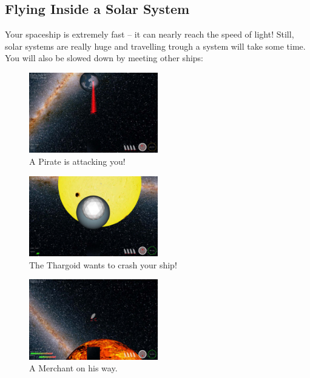 \documentclass[a4paper,11pt]{article}
\begin{document}
\subsection{Flying Inside a Solar System}
Your spaceship is extremely fast -- it can nearly reach the speed of light! Still, solar systems
are really huge and travelling trough a system will take some time. You will also be slowed down by meeting other ships: 
\begin{figure}[ht]
	\centering
		\includegraphics[width=0.50\textwidth]{pirateattacks.jpg}
		\caption{A Pirate is attacking you!\label{pirates}}
\end{figure}
\begin{figure}[ht]
	\centering
		\includegraphics[width=0.50\textwidth]{thargoidchrashing.jpg}
		\caption{The Thargoid wants to crash your ship!\label{thargoids}}
\end{figure}
\begin{figure}[ht]
	\centering
		\includegraphics[width=0.50\textwidth]{merchant.jpg}
		\caption{A Merchant on his way.\label{merchant}}
\end{figure}
\end{document}

